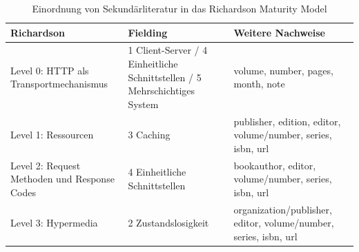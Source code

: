 \begin{table}
\footnotesize
\begin{tabular}{p{3cm}|p{6cm}|p{6cm}}
    \textbf{Richardson} & \textbf{Fielding} & \textbf{Weitere Nachweise} \\
    \hline
    Level 0: HTTP als Transportmechanismus & 1 Client-Server / 4 Einheitliche Schnittstellen / 5 Mehrschichtiges System  & volume, number, pages, month, note \\
    \hline
    Level 1: Ressourcen & 3 Caching & publisher, edition, editor, \mbox{volume/number}, series, isbn, url \\
    \hline
    Level 2: Request Methoden und Response Codes & 4 Einheitliche Schnittstellen  & bookauthor, editor, volume/number, series, isbn, url \\
    \hline
    Level 3: Hypermedia & 2 Zustandslosigkeit  & organization/publisher, editor, volume/number, series, isbn, url  \\
\end{tabular}
\caption{Einordnung von Sekundärliteratur in das Richardson Maturity Model}
\label{tab:EinordnungRichardson}
\end{table}

